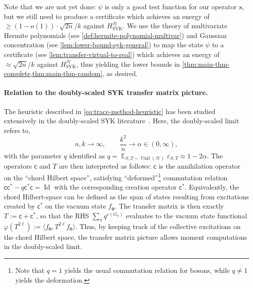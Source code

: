 \documentclass
[11pt,letterpaper]
{article}
\theoremstyle{definition}
\newcommand{\sfc}{\mathsf c}
\newcommand{\sfx}{\mathsf x}
\newcommand{\eps}{\varepsilon}
\newcommand{\1}{\mathbf{1}}
\newcommand{\cH}{\mathcal H}
\newcommand{\Id}{\operatorname{Id}}
\DeclareMathOperator*{\E}{\mathbb{E}}
\renewcommand{\geq}{\geqslant}
\newcommand{\Unif}{\operatorname{Unif}}
\begin{document}
Note that we are not yet done: $\psi$ is only a good test function for our operator $\sfx$, but we still need to produce a certificate which achieves an energy of $\geq(1 - o(1))\cdot\sqrt{2n}/k$ against $H^\cH_{\operatorname{SYK}}$. We use the theory of multivariate Hermite polynomials (see \cref{def:hermite-polynomial-multivar}) and Gaussian concentration (see \cref{lem:lower-bound-syk-general}) to map the state $\psi$ to a certificate (see \cref{lem:transfer-virtual-to-real}) which achieves an energy of $\approx\sqrt{2n}/k$ against $H^\cH_{\operatorname{SYK}}$, thus yielding the lower bounds in \cref{thm:main-thm-complete,thm:main-thm-random}, as desired.

\paragraph{Relation to the doubly-scaled SYK transfer matrix picture.} The heuristic described in \cref{eq:trace-method-heuristic} has been studied extensively in the doubly-scaled SYK literature~\cite{SYK_Berkooz1,SYK_Berkooz2,SYK_Berkooz3,SYK_Garcia1,SYK_Garcia2,SYK_Garcia3,SYK_Jia,lin2022bulk,lin2023symmetry}. Here, the doubly-scaled limit refers to, 
\[
n,k\to\infty,
\qquad
\frac{k^2}{n}\to\alpha\in(0,\infty),
\]
with the parameter $q$ identified as $q=\E_{S,T\sim\Unif(\cH)}\eps_{S,T}\approx 1 - 2\alpha$. The operators $\sfc$ and $T$ are then interpreted as follows: $\sfc$ is the annihilation operator on the ``chord Hilbert space'', satisfying ``deformed''\footnote{Note that $q = 1$ yields the usual commutation relation for bosons, while $q \neq 1$ yields the deformation.} 
 commutation relation $\sfc\sfc^* - q \sfc^*\sfc = \Id$ with the corresponding creation operator $\sfc^*$. Equivalently, the chord Hilbert-space can be defined as the span of states resulting from excitations created by $\sfc^*$ on the vacuum state $f_{\bm 0}$. The transfer matrix is then exactly $T:= \sfc + \sfc^*$, so that the RHS $\sum_\pi q^{e(G_\pi)}$ evaluates to the vacuum state functional $\varphi(T^{2\ell}):= \langle f_{\bm 0},T^{2\ell}f_{\bm 0}\rangle$. Thus, by keeping track of the collective excitations on the chord Hilbert space, the transfer matrix picture allows moment computations in the doubly-scaled limit.
\end{document}
